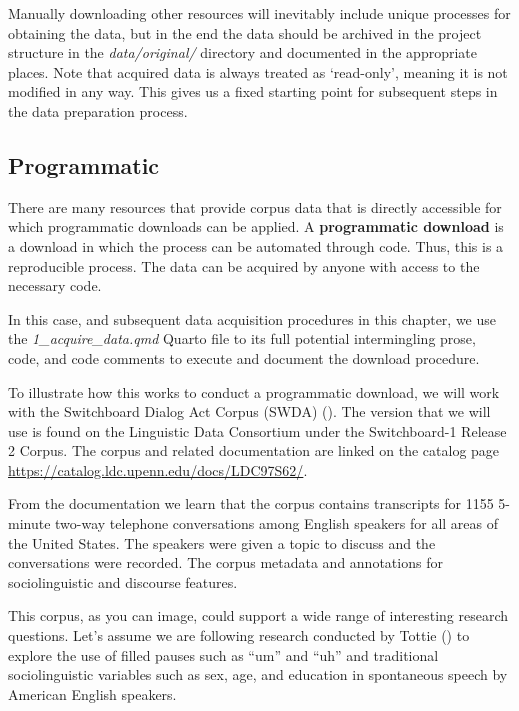 \documentclass[
  letterpaper,
  krantz1]{latex/krantz-mod}
\theoremstyle{definition}
\theoremstyle{definition}
\theoremstyle{remark}
\begin{document}
Manually downloading other resources will inevitably include unique
processes for obtaining the data, but in the end the data should be
archived in the project structure in the \emph{data/original/} directory
and documented in the appropriate places. Note that acquired data is
always treated as `read-only', meaning it is not modified in any way.
This gives us a fixed starting point for subsequent steps in the data
preparation process.

\subsection{Programmatic}\label{programmatic}

There are many resources that provide corpus data that is directly
accessible for which programmatic downloads can be applied. A
\textbf{programmatic download} is a download in which the process can be
automated through code. Thus, this is a reproducible process. The data
can be acquired by anyone with access to the necessary code.

In this case, and subsequent data acquisition procedures in this
chapter, we use the \emph{1\_acquire\_data.qmd} Quarto file to its full
potential intermingling prose, code, and code comments to execute and
document the download procedure.

To illustrate how this works to conduct a programmatic download, we will
work with the Switchboard Dialog Act Corpus (SWDA)
(). The version that we
will use is found on the Linguistic Data Consortium under the
Switchboard-1 Release 2 Corpus. The corpus and related documentation are
linked on the catalog page
\url{https://catalog.ldc.upenn.edu/docs/LDC97S62/}.

From the documentation we learn that the corpus contains transcripts for
1155 5-minute two-way telephone conversations among English speakers for
all areas of the United States. The speakers were given a topic to
discuss and the conversations were recorded. The corpus metadata and
annotations for sociolinguistic and discourse
features.

This corpus, as you can image, could support a wide range of interesting
research questions. Let's assume we are following research conducted by
Tottie () to explore the use of filled
pauses such as ``um'' and ``uh'' and traditional sociolinguistic
variables such as sex, age, and education in spontaneous speech by
American English speakers.
\end{document}
